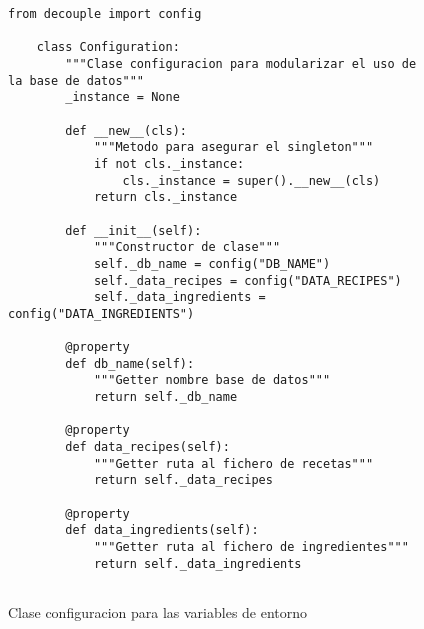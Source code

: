 \newpage
\begin{figure}[H]
\begin{lstlisting}[style=python]
    from decouple import config

    class Configuration:
        """Clase configuracion para modularizar el uso de la base de datos"""
        _instance = None
    
        def __new__(cls):
            """Metodo para asegurar el singleton"""
            if not cls._instance:
                cls._instance = super().__new__(cls)
            return cls._instance
        
        def __init__(self):
            """Constructor de clase"""
            self._db_name = config("DB_NAME")
            self._data_recipes = config("DATA_RECIPES")
            self._data_ingredients = config("DATA_INGREDIENTS")
        
        @property
        def db_name(self):
            """Getter nombre base de datos"""
            return self._db_name
    
        @property
        def data_recipes(self):
            """Getter ruta al fichero de recetas"""
            return self._data_recipes
        
        @property
        def data_ingredients(self):
            """Getter ruta al fichero de ingredientes"""
            return self._data_ingredients
    
\end{lstlisting}
\caption{Clase configuracion para las variables de entorno}
\label{sni:entorno}
\end{figure}